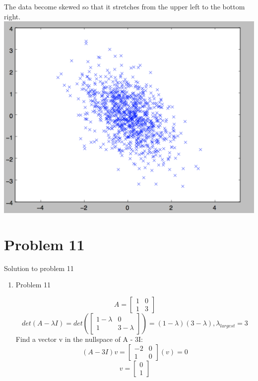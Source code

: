 \documentclass[11pt]{article}
\newcommand{\solution}[1]{{{\color{blue}{\bf Solution:} {#1}}}}
\begin{document}
\begin{enumerate}
\begin{enumerate}
\solution{
The data become skewed so that it stretches from the upper left to the bottom right.  \newline
\includegraphics[scale=0.5]{fig5.png}
}

\end{enumerate}



\end{enumerate}
\newpage

\section{Problem 11}

\solution{Solution to problem 11}
\begin{enumerate}
\item Problem 11

\solution{
\[A = \begin{bmatrix} 1 & 0 \\ 1 & 3 \end{bmatrix} \]
\[det(A - \lambda I) = det(\begin{bmatrix} 1 - \lambda & 0 \\ 1  & 3 - \lambda \end{bmatrix}) = (1-\lambda)(3-\lambda), \lambda_{largest} = 3  \]
Find a vector v in the nullspace of A - 3I:
\[(A - 3I)v = \begin{bmatrix} -2 & 0 \\ 1 & 0 \end{bmatrix}(v) = 0 \]
\[v = \begin{bmatrix} 0 \\ 1 \end{bmatrix} \]
}

\end{enumerate}
\end{document}
